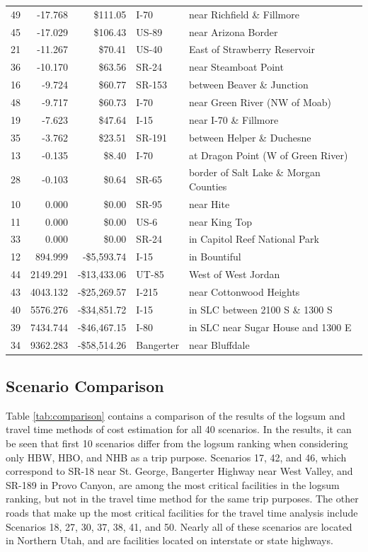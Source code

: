 \begin{table}
\begin{tabular}[t]{crrll}
49 & -17.768 & \$111.05 & I-70 & near Richfield \& Fillmore\\
45 & -17.029 & \$106.43 & US-89 & near Arizona Border\\
21 & -11.267 & \$70.41 & US-40 & East of Strawberry Reservoir\\
36 & -10.170 & \$63.56 & SR-24 & near Steamboat Point\\
16 & -9.724 & \$60.77 & SR-153 & between Beaver \& Junction\\
48 & -9.717 & \$60.73 & I-70 & near Green River (NW of Moab)\\
19 & -7.623 & \$47.64 & I-15 & near I-70 \& Fillmore\\
35 & -3.762 & \$23.51 & SR-191 & between Helper \& Duchesne\\
13 & -0.135 & \$8.40 & I-70 & at Dragon Point (W of Green River)\\
28 & -0.103 & \$0.64 & SR-65 & border of Salt Lake \& Morgan Counties\\
10 & 0.000 & \$0.00 & SR-95 & near Hite\\
11 & 0.000 & \$0.00 & US-6 & near King Top\\
33 & 0.000 & \$0.00 & SR-24 & in Capitol Reef National Park\\
12 & 894.999 & -\$5,593.74 & I-15 & in Bountiful\\
44 & 2149.291 & -\$13,433.06 & UT-85 & West of West Jordan\\
43 & 4043.132 & -\$25,269.57 & I-215 & near Cottonwood Heights\\
40 & 5576.276 & -\$34,851.72 & I-15 & in SLC between 2100 S \& 1300 S\\
39 & 7434.744 & -\$46,467.15 & I-80 & in SLC near Sugar House and 1300 E\\
34 & 9362.283 & -\$58,514.26 & Bangerter & near Bluffdale\\
\bottomrule
\end{tabular}
\end{table}


\subsection{Scenario Comparison}
Table \ref{tab:comparison} contains a comparison of the results of the logsum
and travel time methods of cost estimation for all 40 scenarios. In the results,
it can be seen that first 10 scenarios differ from the logsum ranking when considering
only HBW, HBO, and NHB as a trip purpose. Scenarios 17, 42, and 46, which
correspond to SR-18 near St. George, Bangerter Highway near West Valley, and SR-189
in Provo Canyon, are among the
most critical facilities in the logsum ranking, but not in the travel time method
for the same trip purposes. The other roads that make up the most critical facilities
for the travel time analysis include Scenarios 18, 27, 30, 37, 38, 41, and 50.
Nearly all of these scenarios are located in Northern Utah, and are facilities
located on interstate or state highways.

